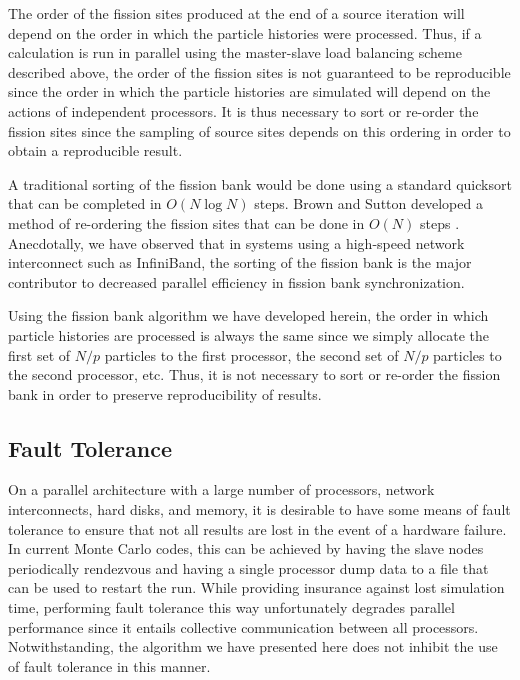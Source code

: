 The order of the fission sites produced at the end of a source iteration will
depend on the order in which the particle histories were processed. Thus, if a
calculation is run in parallel using the master-slave load balancing scheme
described above, the order of the fission sites is not guaranteed to be
reproducible since the order in which the particle histories are simulated will
depend on the actions of independent processors. It is thus necessary to sort or
re-order the fission sites since the sampling of source sites depends on this
ordering in order to obtain a reproducible result.

A traditional sorting of the fission bank would be done using a standard
quicksort that can be completed in $O(N \log N)$ steps. Brown and Sutton
developed a method of re-ordering the fission sites that can be done in $O(N)$
steps \cite{trans-brown-1992}. Anecdotally, we have observed that in systems
using a high-speed network interconnect such as InfiniBand, the sorting of the
fission bank is the major contributor to decreased parallel efficiency in
fission bank synchronization.

Using the fission bank algorithm we have developed herein, the order in which
particle histories are processed is always the same since we simply allocate the
first set of $N/p$ particles to the first processor, the second set of $N/p$
particles to the second processor, etc. Thus, it is not necessary to sort or
re-order the fission bank in order to preserve reproducibility of results.

\subsection{Fault Tolerance}

On a parallel architecture with a large number of processors, network
interconnects, hard disks, and memory, it is desirable to have some means of
fault tolerance to ensure that not all results are lost in the event of a
hardware failure. In current Monte Carlo codes, this can be achieved by having
the slave nodes periodically rendezvous and having a single processor dump data
to a file that can be used to restart the run. While providing insurance against
lost simulation time, performing fault tolerance this way unfortunately degrades
parallel performance since it entails collective communication between all
processors. Notwithstanding, the algorithm we have presented here does not
inhibit the use of fault tolerance in this manner.

